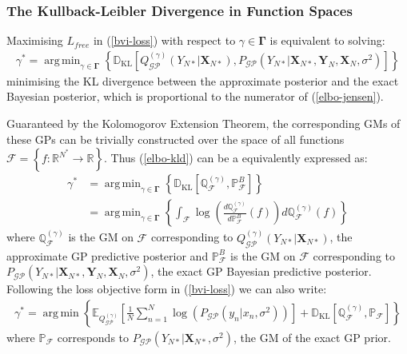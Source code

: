 \documentclass{article}
\newcommand{\KLD}{\operatorname{\mathbb{D}_{KL}}}
\newcommand{\GP}{\operatorname{\mathcal{GP}}}
\DeclareMathOperator*{\argmin}{arg\,min}
\numberwithin{equation}{section}
\begin{document}
\subsubsection{The Kullback-Leibler Divergence in Function Spaces}
Maximising $L_{free}$ in (\ref{bvi-loss}) with respect to $\gamma \in \mathbf{\Gamma}$ is equivalent to solving:
\begin{align}
    \gamma^* = \argmin_{\gamma \in \mathbf{\Gamma}} \left\{\KLD \left[ Q_{\GP}^{(\gamma)}\left(Y_{N*} \vert \mathbf{X}_{N*}\right) ,  P_{\GP}\left(Y_{N*} \vert \mathbf{X}_{N*}, \mathbf{Y}_N, \mathbf{X}_N, \sigma^2 \right) \right]\right\}
    \label{elbo-kld}
\end{align}
minimising the KL divergence between the approximate posterior and the exact Bayesian posterior, which is proportional to the numerator of (\ref{elbo-jensen}). 

Guaranteed by the Kolomogorov Extension Theorem, the corresponding GMs of these GPs can be trivially constructed over the space of all functions $\mathcal{F} = \left\{f: \mathbb{R}^{N^*} \rightarrow \mathbb{R} \right\}$. Thus (\ref{elbo-kld}) can be a equivalently expressed as:
\begin{align}
    \label{kld-function-spaces}
    \gamma^* &=\argmin_{\gamma \in \mathbf{\Gamma}}  \left\{ \KLD\left[ \mathbb{Q}^{(\gamma)}_\mathcal{F},  \mathbb{P}^B_\mathcal{F}\right] \right\} \\
    &= \argmin_{\gamma \in \mathbf{\Gamma}} \left\{\int_{\mathcal{F}} \log \left( \frac{d \mathbb{Q}^{(\gamma)}_\mathcal{F}}{d \mathbb{P}^B_\mathcal{F}} (f)\right)d \mathbb{Q}^{(\gamma)}_\mathcal{F}(f) \right\}
    \label{radon-nikodym}
\end{align}
where $\mathbb{Q}^{(\gamma)}_\mathcal{F}$ is the GM on $\mathcal{F}$ corresponding to $Q_{\GP}^{(\gamma)}\left(Y_{N*} \vert \mathbf{X}_{N*}\right)$, the approximate GP predictive posterior and $\mathbb{P}^B_\mathcal{F}$ is the GM on $\mathcal{F}$ corresponding to $P_{\GP}\left(Y_{N*} \vert \mathbf{X}_{N*}, \mathbf{Y}_N, \mathbf{X}_N, \sigma^2 \right)$, the exact GP Bayesian predictive posterior. Following the loss objective form in (\ref{bvi-loss}) we can also write:
\begin{align}
    \gamma^* = \argmin \left\{ \mathbb{E}_{Q^{(\gamma)}_{\GP}}\left[\frac{1}{N}\sum_{n=1}^N\log \left(P_{\GP}\left(y_n \vert x_n, \sigma^2\right)\right)\right] + \KLD \left[\mathbb{Q}^{(\gamma)}_{\mathcal{F}}, \mathbb{P}_{\mathcal{F}} \right] \right\}
    \label{bvi-gm-loss}
\end{align}
where $\mathbb{P}_\mathcal{F}$ corresponds to $P_{\GP}\left(Y_{N*} \vert \mathbf{X}_{N*}, \sigma^2 \right)$, the GM of the exact GP prior.
\end{document}
